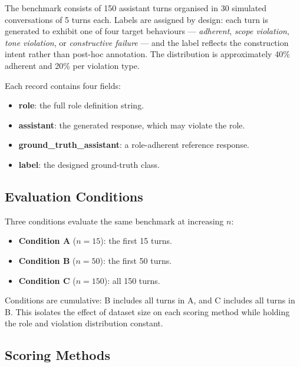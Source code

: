 \documentclass[11pt,a4paper]{article}
\begin{document}
The benchmark consists of 150 assistant turns organised in 30 simulated
conversations of 5 turns each. Labels are assigned by design: each turn is
generated to exhibit one of four target behaviours --- \emph{adherent},
\emph{scope violation}, \emph{tone violation}, or \emph{constructive failure}
--- and the label reflects the construction intent rather than post-hoc
annotation. The distribution is approximately 40\% adherent and 20\% per
violation type.

Each record contains four fields:

\begin{itemize}
  \item \textbf{role}: the full role definition string.
  \item \textbf{assistant}: the generated response, which may violate the role.
  \item \textbf{ground\_truth\_assistant}: a role-adherent reference response.
  \item \textbf{label}: the designed ground-truth class.
\end{itemize}

\subsection{Evaluation Conditions}

Three conditions evaluate the same benchmark at increasing $n$:

\begin{itemize}
  \item \textbf{Condition A} ($n = 15$): the first 15 turns.
  \item \textbf{Condition B} ($n = 50$): the first 50 turns.
  \item \textbf{Condition C} ($n = 150$): all 150 turns.
\end{itemize}

Conditions are cumulative: B includes all turns in A, and C includes all turns
in B. This isolates the effect of dataset size on each scoring method while
holding the role and violation distribution constant.

\newpage

\subsection{Scoring Methods}
\end{document}
